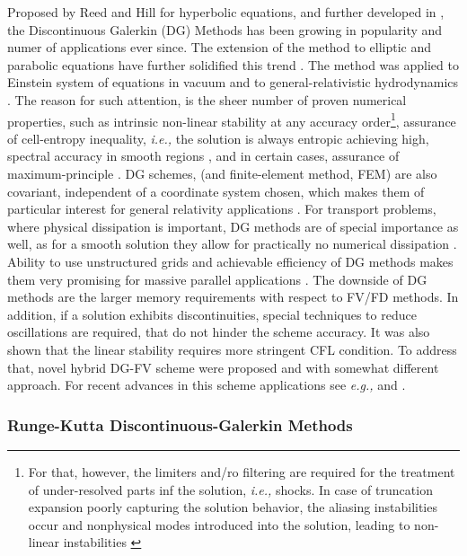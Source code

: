 \documentclass[11pt,a4paper,headinclude=true,DIV=14,BCOR=8mm,chapterprefix,listof=totoc,twoside,openright,abstracton]{scrbook}
\begin{document}
Proposed by Reed and Hill \cite{Reed:1973} for hyperbolic equations, and further developed in  \cite{Cockburn:1991,Cockburn:1989ii,Cockburn:1989iii,Cockburn:1990iv,Cockburn:1998v}, the Discontinuous Galerkin (DG) Methods has been growing in popularity and numer of applications ever since. The extension of the method to elliptic and parabolic equations \cite{Arnold:2002} have further solidified this trend \cite{Cockburn:2000,Canuto:2008,Hesthaven:2007}. The method was applied to Einstein system of equations in vacuum \cite{Field:2010} and to general-relativistic hydrodynamics \cite{Radice:2011qr}. The reason for such attention, is the sheer number of proven numerical properties, such as intrinsic non-linear stability at any accuracy order\footnote{For that, however, the limiters and/ro filtering are required for the treatment of under-resolved parts inf the solution, \textit{i.e.,} shocks. In case of truncation expansion poorly capturing the solution behavior, the aliasing instabilities occur and nonphysical modes introduced into the solution, leading to non-linear instabilities \cite{Boyd:2001}}, assurance of cell-entropy inequality, \textit{i.e.,} the solution is always entropic achieving high, spectral accuracy in smooth regions \cite{Cockburn:2003}, and in certain cases, assurance of maximum-principle \cite{Zhang:2011}. DG schemes, (and finite-element method, FEM)  are also covariant, independent of a coordinate system chosen, which makes them of particular interest for general relativity applications \cite{Meier:1999}. For transport problems, where physical dissipation is important, DG methods are of special importance as well, as for a smooth solution they allow for practically no numerical dissipation \cite{Cockburn:2003}. Ability to use unstructured grids and achievable efficiency of DG methods makes them very promising for massive parallel applications \cite{Biswas:1994}. 
The downside of DG methods are the larger memory requirements with respect to FV/FD methods. In addition, if a solution exhibits discontinuities, special techniques to reduce oscillations are required, that do not hinder the scheme accuracy. It was also shown that the linear stability requires more stringent CFL condition. To address that, novel hybrid DG-FV scheme were proposed \cite{Qiu:2005,Qiu:2004} and \cite{Dumbser:2009,Dumbser:2008} with somewhat different approach. For recent advances in this scheme applications see \textit{e.g.,} \cite{Gassner:2011} and \cite{Hesthaven:2007}.


\subsubsection{Runge-Kutta Discontinuous-Galerkin Methods}
\end{document}
